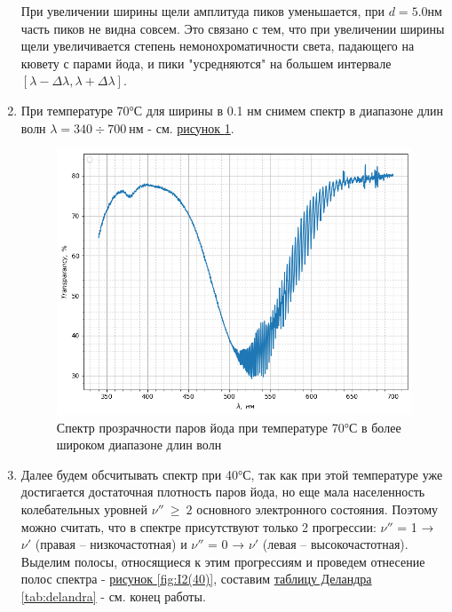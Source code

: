 \documentclass{article}
\begin{document}
\begin{enumerate}
При увеличении ширины щели амплитуда пиков уменьшается, при $d = 5.0 нм$ часть пиков не видна совсем. Это связано с тем, что при увеличении ширины щели увеличивается степень немонохроматичности света, падающего на кювету с парами йода, и пики "усредняются" на большем интервале $[\lambda - \Delta \lambda, \lambda + \Delta \lambda]$.
\item При температуре 70°С для ширины в 0.1 нм снимем спектр в диапазоне длин волн $\lambda = 340 \div 700~нм$ - см. \hyperref[fig:I2(70-wide)]{рисунок \ref*{fig:I2(70-wide)}}.
\begin{figure}[h!]
    \centering
    \includegraphics[scale = 0.6]{I2(70-wide).png}
    \caption{Спектр прозрачности паров йода при температуре 70°С в более широком диапазоне длин волн}
    \label{fig:I2(70-wide)}
\end{figure}
\newpage
\item Далее будем обсчитывать спектр при 40°С, так как при этой температуре уже достигается достаточная плотность паров йода, но еще мала населенность колебательных уровней $\nu ''~\geqslant ~2$ основного электронного состояния. Поэтому можно считать, что в спектре присутствуют только 2 прогрессии:
$\nu ''$ = 1 → $\nu '$ (правая – низкочастотная) и $\nu ''$ = 0 → $\nu '$ (левая – высокочастотная). Выделим полосы, относящиеся к этим прогрессиям и проведем отнесение полос спектра - \hyperref[fig:I2(40)]{рисунок \ref*{fig:I2(40)}}, составим \hyperref[tab:delandra]{таблицу Деландра \ref*{tab:delandra}} - см. конец работы.
\begin{figure}[h!]
    \centering

\end{figure}
\end{enumerate}
\end{document}
